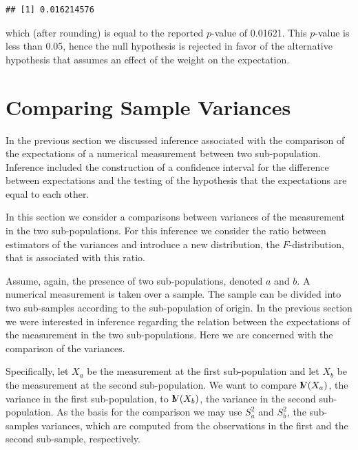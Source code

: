 \documentclass[]{krantz}
\newcommand{\Var}{{\rm I\kern-.3em V}}
\theoremstyle{definition}
\theoremstyle{definition}
\theoremstyle{definition}
\theoremstyle{remark}
\begin{document}
\begin{verbatim}
## [1] 0.016214576
\end{verbatim}

which (after rounding) is equal to the reported \(p\)-value of 0.01621.
This \(p\)-value is less than 0.05, hence the null hypothesis is rejected
in favor of the alternative hypothesis that assumes an effect of the
weight on the expectation.

\hypertarget{comparing-sample-variances}{%
\section{Comparing Sample Variances}\label{comparing-sample-variances}}

In the previous section we discussed inference associated with the
comparison of the expectations of a numerical measurement between two
sub-population. Inference included the construction of a confidence
interval for the difference between expectations and the testing of the
hypothesis that the expectations are equal to each other.

In this section we consider a comparisons between variances of the
measurement in the two sub-populations. For this inference we consider
the ratio between estimators of the variances and introduce a new
distribution, the \(F\)-distribution, that is associated with this ratio.

Assume, again, the presence of two sub-populations, denoted \(a\) and \(b\).
A numerical measurement is taken over a sample. The sample can be
divided into two sub-samples according to the sub-population of origin.
In the previous section we were interested in inference regarding the
relation between the expectations of the measurement in the two
sub-populations. Here we are concerned with the comparison of the
variances.

Specifically, let \(X_a\) be the measurement at the first sub-population
and let \(X_b\) be the measurement at the second sub-population. We want
to compare \(\Var(X_a)\), the variance in the first sub-population, to
\(\Var(X_b)\), the variance in the second sub-population. As the basis for
the comparison we may use \(S_a^2\) and \(S_b^2\), the sub-samples
variances, which are computed from the observations in the first and the
second sub-sample, respectively.
\end{document}

